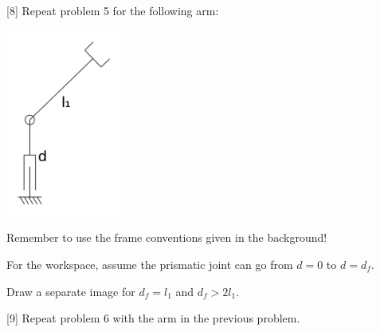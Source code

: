 \documentclass{16384_doc}
\begin{document}
\begin{questions}
\begin{parts}
\begin{parts}
        \end{parts}
    \end{parts}

    \newpage

    [8]
    Repeat problem 5 for the following arm:

    \begin{center}
    \includegraphics[width=1.5in]{generated_figures/robot_7.png}
    \end{center}
    Remember to use the frame conventions given in the background!

    \begin{tcolorbox}[height=13cm]
    \end{tcolorbox}

    \newpage

    For the workspace, assume the prismatic joint can go from $d=0$ to $d=d_f$.
    
    \begin{tcolorbox}[height=10cm]
    \end{tcolorbox}
    
    Draw a separate image for $d_f = l_1$ and $d_f > 2 l_1$.

    \begin{tcolorbox}[height=10cm]
    \end{tcolorbox}

    \newpage

    [9]
    Repeat problem 6 with the arm in the previous problem.

\end{questions}
\end{document}
